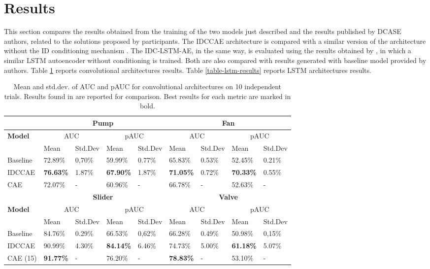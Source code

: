 \section{Results}
This section compares the results obtained from the training of the two models just described and the results published by DCASE authors, related to the solutions proposed by participants. The IDCCAE architecture is compared with a similar version of the architecture without the ID conditioning mechanism \cite{15DeepDenseConvAE}. The IDC-LSTM-AE, in the same way, is evaluated using the results obtained by \cite{16LSTMDeepAutoencodersForASDtask}, in which a similar LSTM autoencoder without conditioning is trained. Both are also compared with results generated with baseline model provided by authors. Table \ref{table-conv-results} reports convolutional architectures results. Table \ref{table-lstm-results} reports LSTM architectures results.
\begin{table}[ht]
\small
\centering
\begin{tabular}{|m{1.8cm}|m{1.3cm}|m{1.25cm}|m{1.3cm}|m{1.25cm}|m{1.3cm}|m{1.25cm}|m{1.3cm}|m{1.25cm}|} 
\cline{2-9}
\multicolumn{1}{c|}{} & \multicolumn{4}{c|}{\textbf{Pump}} & \multicolumn{4}{c|}{\textbf{Fan}} \\ 
\hline
\multirow{2}{*}{\textbf{Model}} & \multicolumn{2}{c|}{AUC} & \multicolumn{2}{c|}{pAUC} & \multicolumn{2}{c|}{AUC} & \multicolumn{2}{c|}{pAUC} \\ 
\cline{2-9}
 & Mean & Std.Dev & Mean & Std.Dev & Mean & Std.Dev & Mean & Std.Dev \\ 
\hline
Baseline & 72.89\% & 0,70\%~ & 59.99\% & 0.77\% & 65.83\% & 0.53\% & 52.45\% & 0.21\% \\ 
\hline
IDCCAE & \textbf{76.63\%} & 1.87\% & \textbf{67.90\%} & 1.87\% & \textbf{71.05\%} & 0.72\% & \textbf{70.33\%} & 0.55\% \\ 
\hline
CAE \cite{15DeepDenseConvAE} & 72.07\% & - & 60.96\% & - & 66.78\% & - & 52.63\% & - \\ 
\hline
\multicolumn{1}{c|}{} & \multicolumn{4}{c|}{\textbf{Slider}} & \multicolumn{4}{c|}{\textbf{Valve}} \\ 
\hline
\multirow{2}{*}{\textbf{Model}} & \multicolumn{2}{c|}{AUC} & \multicolumn{2}{c|}{pAUC} & \multicolumn{2}{c|}{AUC} & \multicolumn{2}{c|}{pAUC} \\ 
\cline{2-9}
 & Mean & Std.Dev & Mean & Std.Dev & Mean & Std.Dev & Mean & Std.Dev \\ 
\hline
Baseline & 84.76\% & 0.29\% & 66.53\% & 0,62\%~ & 66.28\% & 0.49\% & 50.98\% & 0,15\%~ \\ 
\hline
IDCCAE & 90.99\% & 4.30\% & \textbf{84.14\%} & 6.46\% & 74.73\% & 5.00\% & \textbf{61.18\%} & 5.07\% \\ 
\hline
CAE (15) & \textbf{91.77\%} & - & 76.20\% & - & \textbf{78.83\%} & - & 53.10\% & - \\
\hline
\end{tabular}
\caption{ Mean and std.dev. of AUC and pAUC for convolutional architectures on 10 independent trials. Results found in \cite{15DeepDenseConvAE} are reported for comparison. Best results for each metric are marked in bold.}
\label{table-conv-results}
\end{table}

